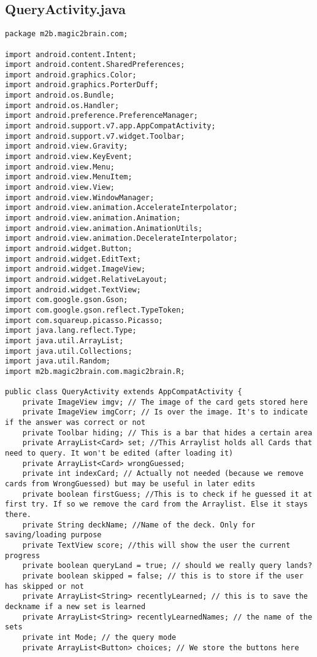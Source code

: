 \subsection*{QueryActivity.java}
\begin{lstlisting}
package m2b.magic2brain.com;

import android.content.Intent;
import android.content.SharedPreferences;
import android.graphics.Color;
import android.graphics.PorterDuff;
import android.os.Bundle;
import android.os.Handler;
import android.preference.PreferenceManager;
import android.support.v7.app.AppCompatActivity;
import android.support.v7.widget.Toolbar;
import android.view.Gravity;
import android.view.KeyEvent;
import android.view.Menu;
import android.view.MenuItem;
import android.view.View;
import android.view.WindowManager;
import android.view.animation.AccelerateInterpolator;
import android.view.animation.Animation;
import android.view.animation.AnimationUtils;
import android.view.animation.DecelerateInterpolator;
import android.widget.Button;
import android.widget.EditText;
import android.widget.ImageView;
import android.widget.RelativeLayout;
import android.widget.TextView;
import com.google.gson.Gson;
import com.google.gson.reflect.TypeToken;
import com.squareup.picasso.Picasso;
import java.lang.reflect.Type;
import java.util.ArrayList;
import java.util.Collections;
import java.util.Random;
import m2b.magic2brain.com.magic2brain.R;

public class QueryActivity extends AppCompatActivity {
    private ImageView imgv; // The image of the card gets stored here
    private ImageView imgCorr; // Is over the image. It's to indicate if the answer was correct or not
    private Toolbar hiding; // This is a bar that hides a certain area
    private ArrayList<Card> set; //This Arraylist holds all Cards that need to query. It won't be edited (after loading it)
    private ArrayList<Card> wrongGuessed;
    private int indexCard; // Actually not needed (because we remove cards from WrongGuessed) but may be useful in later edits
    private boolean firstGuess; //This is to check if he guessed it at first try. If so we remove the card from the Arraylist. Else it stays there.
    private String deckName; //Name of the deck. Only for saving/loading purpose
    private TextView score; //this will show the user the current progress
    private boolean queryLand = true; // should we really query lands?
    private boolean skipped = false; // this is to store if the user has skipped or not
    private ArrayList<String> recentlyLearned; // this is to save the deckname if a new set is learned
    private ArrayList<String> recentlyLearnedNames; // the name of the sets
    private int Mode; // the query mode
    private ArrayList<Button> choices; // We store the buttons here


\end{lstlisting}
